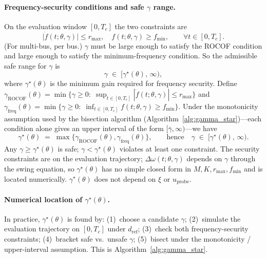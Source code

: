 \documentclass[10pt]{article}
\newcommand{\gammaROCOF}{\gamma_{\mathrm{ROCOF}}}
\newcommand{\gammafreq}{\gamma_{\mathrm{freq}}}
\begin{document}
\paragraph{Frequency-security conditions and safe $\gamma$ range.}
On the evaluation window $[0,T_c]$ the two constraints are
\begin{equation}
\label{eq:safety_conditions}
\big|\dot f(t;\theta,\gamma)\big|\le r_{\max},\quad f(t;\theta,\gamma)\ge f_{\min},\qquad \forall t\in[0,T_c].
\end{equation}
(For multi-bus, per bus.) $\gamma$ must be large enough to satisfy the ROCOF condition and large enough to satisfy the minimum-frequency condition. So the admissible safe range for $\gamma$ is
\begin{equation}
\label{eq:gamma_range}
\gamma\;\in\;\big[\gamma^\star(\theta),\,\infty\big),
\end{equation}
where $\gamma^\star(\theta)$ is the minimum gain required for frequency security. Define $\gammaROCOF(\theta)=\min\{\gamma\ge 0:\;\sup_{t\in[0,T_c]}|\dot f(t;\theta,\gamma)|\le r_{\max}\}$ and $\gammafreq(\theta)=\min\{\gamma\ge 0:\;\inf_{t\in[0,T_c]}f(t;\theta,\gamma)\ge f_{\min}\}$. Under the monotonicity assumption used by the bisection algorithm (Algorithm~\ref{alg:gamma_star})---each condition alone gives an upper interval of the form $[\bar\gamma,\infty)$---we have
\begin{equation}
\label{eq:gamma_star}
\gamma^\star(\theta)\;=\;\max\big\{\gammaROCOF(\theta),\gammafreq(\theta)\big\},\qquad\text{hence}\quad \gamma\;\in\;\big[\gamma^\star(\theta),\,\infty\big).
\end{equation}
Any $\gamma\ge\gamma^\star(\theta)$ is safe; $\gamma<\gamma^\star(\theta)$ violates at least one constraint. The security constraints are on the evaluation trajectory; $\Delta\omega(t;\theta,\gamma)$ depends on $\gamma$ through the swing equation, so $\gamma^\star(\theta)$ has no simple closed form in $M,K,r_{\max},f_{\min}$ and is located numerically. $\gamma^\star(\theta)$ does not depend on $\xi$ or $u_{\mathrm{probe}}$.

\paragraph{Numerical location of $\gamma^\star(\theta)$.}
In practice, $\gamma^\star(\theta)$ is found by: (1)~choose a candidate $\gamma$; (2)~simulate the evaluation trajectory on $[0,T_c]$ under $d_{\mathrm{ref}}$; (3)~check both frequency-security constraints; (4)~bracket safe vs.\ unsafe $\gamma$; (5)~bisect under the monotonicity / upper-interval assumption. This is Algorithm~\ref{alg:gamma_star}.
\end{document}
